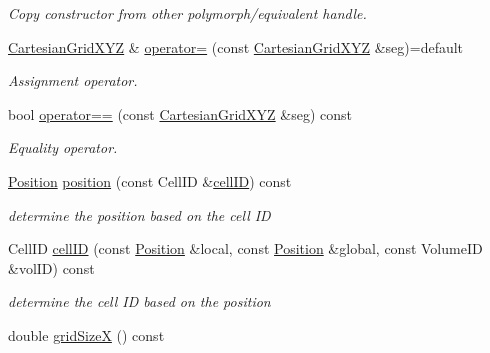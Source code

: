 \begin{DoxyCompactItemize}
\begin{DoxyCompactList}\small\item\em Copy constructor from other polymorph/equivalent handle. \end{DoxyCompactList}\item 
\hyperlink{class_d_d4hep_1_1_geometry_1_1_cartesian_grid_x_y_z}{Cartesian\+Grid\+X\+YZ} \& \hyperlink{class_d_d4hep_1_1_geometry_1_1_cartesian_grid_x_y_z_a2d143d1936cd098233c1ec9b60e9786f}{operator=} (const \hyperlink{class_d_d4hep_1_1_geometry_1_1_cartesian_grid_x_y_z}{Cartesian\+Grid\+X\+YZ} \&seg)=default
\begin{DoxyCompactList}\small\item\em Assignment operator. \end{DoxyCompactList}\item 
bool \hyperlink{class_d_d4hep_1_1_geometry_1_1_cartesian_grid_x_y_z_a9657d5b706869627c2fb51cb442a755f}{operator==} (const \hyperlink{class_d_d4hep_1_1_geometry_1_1_cartesian_grid_x_y_z}{Cartesian\+Grid\+X\+YZ} \&seg) const
\begin{DoxyCompactList}\small\item\em Equality operator. \end{DoxyCompactList}\item 
\hyperlink{namespace_d_d4hep_1_1_geometry_a55083902099d03506c6db01b80404900}{Position} \hyperlink{class_d_d4hep_1_1_geometry_1_1_cartesian_grid_x_y_z_a9c26b2fb2035e0f74fb1a52909ff53e2}{position} (const Cell\+ID \&\hyperlink{class_d_d4hep_1_1_geometry_1_1_cartesian_grid_x_y_z_a8dedaeb385bc59155413184fc796aa56}{cell\+ID}) const
\begin{DoxyCompactList}\small\item\em determine the position based on the cell ID \end{DoxyCompactList}\item 
Cell\+ID \hyperlink{class_d_d4hep_1_1_geometry_1_1_cartesian_grid_x_y_z_a8dedaeb385bc59155413184fc796aa56}{cell\+ID} (const \hyperlink{namespace_d_d4hep_1_1_geometry_a55083902099d03506c6db01b80404900}{Position} \&local, const \hyperlink{namespace_d_d4hep_1_1_geometry_a55083902099d03506c6db01b80404900}{Position} \&global, const Volume\+ID \&vol\+ID) const
\begin{DoxyCompactList}\small\item\em determine the cell ID based on the position \end{DoxyCompactList}\item 
double \hyperlink{class_d_d4hep_1_1_geometry_1_1_cartesian_grid_x_y_z_a91e442353457860559d3cc3ecc3c27dc}{grid\+SizeX} () const

\end{DoxyCompactItemize}
